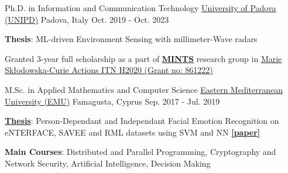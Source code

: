 

\begin{cventries}

  \cventry
    {Ph.D. in Information and Communication Technology} %
    {\href{https://www.unipd.it/}{University of Padova (UNIPD)}} %
    {Padova, Italy} %
    {Oct. 2019 - Oct. 2023} %
    {
      \begin{cvitems} %
        \item {\textbf{Thesis}: ML-driven Environment Sensing with millimeter-Wave radars}
        \item {Granted 3-year full scholarship as a part of \href{https://www.b5g-mints.eu/}{\textbf{MINTS}} research group in \href{https://cordis.europa.eu/project/id/861222}{Marie Skłodowska-Curie Actions ITN H2020 (Grant no: 861222)}}
      \end{cvitems}
    }
  
  \cventry
    {M.Sc. in Applied Mathematics and Computer Science} %
    {\href{https://www.emu.edu.tr/en}{Eastern Mediterranean University (EMU)}} %
    {Famagusta, Cyprus} %
    {Sep. 2017 - Jul. 2019} %
    {
      \begin{cvitems} %
        \item {\href{http://i-rep.emu.edu.tr:8080/xmlui/handle/11129/5291}{\textbf{Thesis}}: Person-Dependant and Independant Facial Emotion Recognition on eNTERFACE, SAVEE and RML datasets using SVM and NN \href{https://link.springer.com/article/10.1007/s11760-020-01830-0}{\textbf{[paper]}}}
        \item {\textbf{Main Courses}: Distributed and Parallel Programming, Cryptography and Network Security, Artificial Intelligence, Decision Making}
      \end{cvitems}
    }


\end{cventries}
